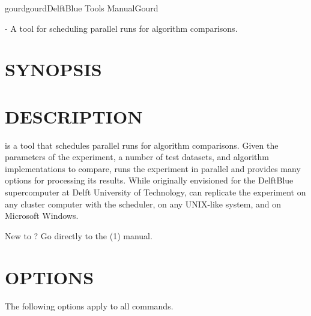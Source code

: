 \documentclass[a4paper,english]{article}
\begin{document}
    \pagestyle{fancy}


    \begin{Name}{1}{gourd}{gourd}{DelftBlue Tools Manual}{Gourd}
\begin{adjustwidth}{18pt}{0pt}

         - A tool for scheduling parallel runs for algorithm comparisons.

\end{adjustwidth}
    \end{Name}


\begin{adjustwidth}{18pt}{0pt}
    \section{SYNOPSIS}

         

    \section{DESCRIPTION}

         is a tool that schedules parallel runs for algorithm comparisons.
        Given the parameters of the experiment, a number of test datasets, and algorithm implementations to compare,
         runs the experiment in parallel and provides many options for processing its results.
        While originally envisioned for the DelftBlue supercomputer at Delft University of Technology,
         can replicate the experiment on any cluster computer with the  scheduler,
        on any UNIX-like system, and on Microsoft Windows.

        New to ? Go directly to the (1) manual.


    \section{OPTIONS}

        The following options apply to all  commands.


\end{adjustwidth}
\end{document}
